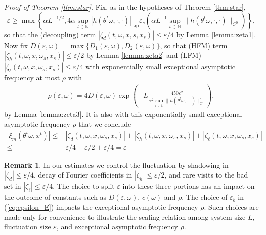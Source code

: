 \documentclass[a4paper]{article}
\theoremstyle{plain}
\theoremstyle{definition}
\newtheorem{rem}[theorem]{Remark}
\newcommand{\N}{\mathbb{N}}
\begin{document}
\textit{Proof of Theorem \ref{thm:star}.} Fix, as in the hypotheses of Theorem \ref{thm:star},
$$\varepsilon\geq  \max\left\{ \alpha L^{-1/2},4\alpha \sup_{t\in\N }|h(\theta^t \omega,\cdot,\cdot)|_{\mathrm{Lip}} \varepsilon_s \left( \alpha L^{-1} \sup_{t\in\N } \|h(\theta^t\omega,\cdot,\cdot)\|_{C^0} \right)\right\},$$
so that the (decoupling) term $\left|\zeta_d(t,\omega,x,{{s}},x_{{s}})\right|\leq \varepsilon/4$ by Lemma \ref{lemma:zeta1}. Now fix $D(\varepsilon,\omega) = \max\{D_1(\varepsilon,\omega),D_2(\varepsilon,\omega)\}$, so that (HFM) term $\left|\zeta_h(t,\omega,x,\omega_{{s}},x_{{s}})\right| \leq\varepsilon/2$ by Lemma \ref{lemma:zeta2} and (LFM) $\left|\zeta_{\ell}(t,\omega,x,\omega_{{s}},x_{{s}})\right| \leq\varepsilon/4$ with exponentially small exceptional asymptotic frequency  at most $\rho$ with 
\begin{align*}
	\rho(\varepsilon,\omega)= 4D(\varepsilon,\omega) \exp\left(-L \frac{450\varepsilon^2}{\alpha^2\sup_{t\in\N }\|h(\theta^t\omega,\cdot,\cdot)\|^2_{C^4}}\right),
\end{align*} 
by Lemma \ref{lemma:zeta3}. It is also with this exponentially small exceptional asymptotic frequency $\rho$ that we conclude
\begin{align*}
	\left|\xi_{m}(\theta^t\omega,x^t)\right| \leq& \left|\zeta_d(t,\omega,x,\omega_{{s}},x_{{s}})\right| +\left|\zeta_h(t,\omega,x,\omega_{{s}},x_{{s}})\right| + \left|\zeta_{\ell}(t,\omega,x,\omega_{{s}},x_{{s}})\right|\\
	\leq& \varepsilon/4 + \varepsilon/2 + \varepsilon/4 = \varepsilon\tag*{\qed}
\end{align*} 


\begin{rem}
	In our estimates we control the fluctuation by shadowing in $|\zeta_d|\leq \varepsilon/4$, decay of Fourier coefficients in $|\zeta_h|\leq \varepsilon/2$, and rare visits to the bad set in $|\zeta_{\ell}|\leq \varepsilon/4$. The choice to split $\varepsilon$ into these three portions has an impact on the outcome of constants such as $D(\varepsilon,\omega)$, $c(\omega)$ and $\rho$. The choice of $\varepsilon_b$ in (\ref{eq:epsilon_E}) impacts the exceptional asymptotic frequency $\rho$. Such choices are made only for convenience to illustrate the scaling relation among system size $L$, fluctuation size $\varepsilon$, and exceptional asymptotic frequency $\rho$. %
\end{rem}
\end{document}
